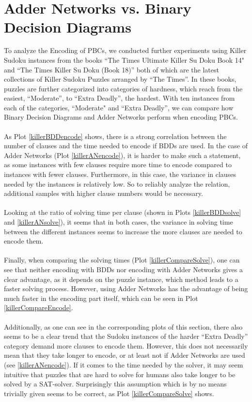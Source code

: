 \section{Adder Networks vs. Binary Decision Diagrams}
To analyze the Encoding of PBCs, we conducted further experiments using Killer Sudoku instances from the books ``The Times Ultimate Killer Su Doku Book 14"\cite{TheTimesUltimateKillerSuDokuBook14} and ``The Times Killer Su Doku (Book 18)''\cite{TheTimesKillerSuDokuBook18} both of which are the latest collections of Killer Sudoku Puzzles arranged by ``The Times''. In these books, puzzles are further categorized into categories of hardness, which reach from the easiest, ``Moderate'', to ``Extra Deadly'', the hardest. With ten instances from each of the categories, ``Moderate" and  ``Extra Deadly'', we can compare how Binary Decision Diagrams and Adder Networks perform when encoding PBCs.\\
\\
As Plot \ref{killerBDDencode} shows, there is a strong correlation between the number of clauses and the time needed to encode if BDDs are used. In the case of Adder Networks (Plot \ref{killerANencode}), it is harder to make such a statement, as some instances with few clauses require more time to encode compared to instances with fewer clauses. Furthermore, in this case, the variance in clauses needed by the instances is relatively low. So to reliably analyze the relation, additional samples with higher clause numbers would be necessary. \\
\\
Looking at the ratio of solving time per clause (shown in Plots \ref{killerBDDsolve} and \ref{killerANsolve}), it seems that in both cases, the variance in solving time between the different instances seems to increase the more clauses are needed to encode them.\\
\\
Finally, when comparing the solving times (Plot \ref{killerCompareSolve}), one can see that neither encoding with BDDs nor encoding with Adder Networks gives a clear advantage, as it depends on the puzzle instance, which method leads to a faster solving process. However, using Adder Networks has the advantage of being much faster in the encoding part itself, which can be seen in Plot \ref{killerCompareEncode}.\\
\\
Additionally, as one can see in the corresponding plots of this section, there also seems to be a clear trend that the Sudoku instances of the harder ``Extra Deadly'' category demand more clauses to encode them. However, this does not necessarily mean that they take longer to encode, or at least not if Adder Networks are used (see \ref{killerANencode}). If it comes to the time needed by the solver, it may seem intuitive that puzzles that are hard to solve for humans also take longer to be solved by a SAT-solver. Surprisingly this assumption which is by no means trivially given seems to be correct, as Plot \ref{killerCompareSolve} shows. 

